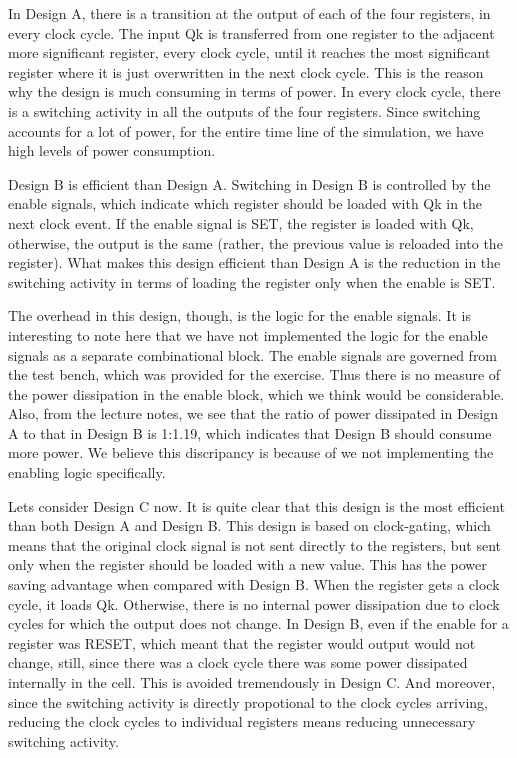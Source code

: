 \documentclass[11pt,a4paper]{article}
\begin{document}
In Design A, there is a transition at the output of each of the four registers, in every clock cycle. The input Qk is transferred from one register to the adjacent more significant register, every clock cycle, until it reaches the most significant register where it is just overwritten in the next clock cycle. This is the reason why the design is much consuming in terms of power. In every clock cycle, there is a switching activity in all the outputs of the four registers. Since switching accounts for a lot of power, for the entire time line of the simulation, we have high levels of power consumption. 

Design B is efficient than Design A. Switching in Design B is controlled by the enable signals, which indicate which register should be loaded with Qk in the next clock event. If the enable signal is SET, the register is loaded with Qk, otherwise, the output is the same (rather, the previous value is reloaded into the register). What makes this design efficient than Design A is the reduction in the switching activity in terms of loading the register only when the enable is SET. 

The overhead in this design, though, is the logic for the enable signals. It is interesting to note here that we have not implemented the logic for the enable signals as a separate combinational block. The enable signals are governed from the test bench, which was provided for the exercise. Thus there is no measure of the power dissipation in the enable block, which we think would be considerable. Also, from the lecture notes, we see that the ratio of power dissipated in Design A to that in Design B is 1:1.19, which indicates that Design B should consume more power. We believe this discripancy is because of we not implementing the enabling logic specifically.

Lets consider Design C now. It is quite clear that this design is the most efficient than both Design A and Design B. This design is based on clock-gating, which means that the original clock signal is not sent directly to the registers, but sent only when the register should be loaded with a new value. This has the power saving advantage when compared with Design B. When the register gets a clock cycle, it loads Qk. Otherwise, there is no internal power dissipation due to clock cycles for which the output does not change. In Design B, even if the enable for a register was RESET, which meant that the register would output would not change, still, since there was a clock cycle there was some power dissipated internally in the cell. This is avoided tremendously in Design C. And moreover, since the switching activity is directly propotional to the clock cycles arriving, reducing the clock cycles to individual registers means reducing unnecessary switching activity.
\end{document}
